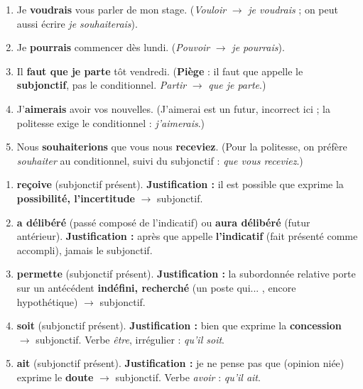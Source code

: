 \documentclass[11pt]{article}
\begin{document}
\begin{corrige}
\begin{enumerate}
    \item Je \textbf{voudrais} vous parler de mon stage. (\emph{Vouloir} $\rightarrow$ \emph{je voudrais} ; on peut aussi écrire \emph{je souhaiterais}).
    \item Je \textbf{pourrais} commencer dès lundi. (\emph{Pouvoir} $\rightarrow$ \emph{je pourrais}).
    \item Il \textbf{faut que je parte} tôt vendredi. (\textbf{Piège} : \og il faut que \fg{} appelle le \textbf{subjonctif}, pas le conditionnel. \emph{Partir} $\rightarrow$ \emph{que je parte}.)
    \item J'\textbf{aimerais} avoir vos nouvelles. (\og J'aimerai \fg{} est un futur, incorrect ici ; la politesse exige le conditionnel : \emph{j'aimerais}.)
    \item Nous \textbf{souhaiterions} que vous nous \textbf{receviez}. (Pour la politesse, on préfère \emph{souhaiter} au conditionnel, suivi du subjonctif : \emph{que vous receviez}.)
\end{enumerate}
\end{corrige}

\begin{corrige}
\begin{enumerate}
    \item \textbf{reçoive} (subjonctif présent). \textbf{Justification :} \og il est possible que \fg{} exprime la \textbf{possibilité, l'incertitude} $\rightarrow$ subjonctif.
    \item \textbf{a délibéré} (passé composé de l'indicatif) ou \textbf{aura délibéré} (futur antérieur). \textbf{Justification :} \og après que \fg{} appelle \textbf{l'indicatif} (fait présenté comme accompli), jamais le subjonctif.
    \item \textbf{permette} (subjonctif présent). \textbf{Justification :} la subordonnée relative porte sur un antécédent \textbf{indéfini, recherché} (\og un poste qui... \fg{}, encore hypothétique) $\rightarrow$ subjonctif.
    \item \textbf{soit} (subjonctif présent). \textbf{Justification :} \og bien que \fg{} exprime la \textbf{concession} $\rightarrow$ subjonctif. Verbe \emph{être}, irrégulier : \emph{qu'il soit}.
    \item \textbf{ait} (subjonctif présent). \textbf{Justification :} \og je ne pense pas que \fg{} (opinion niée) exprime le \textbf{doute} $\rightarrow$ subjonctif. Verbe \emph{avoir} : \emph{qu'il ait}.
\end{enumerate}
\end{corrige}
\end{document}
